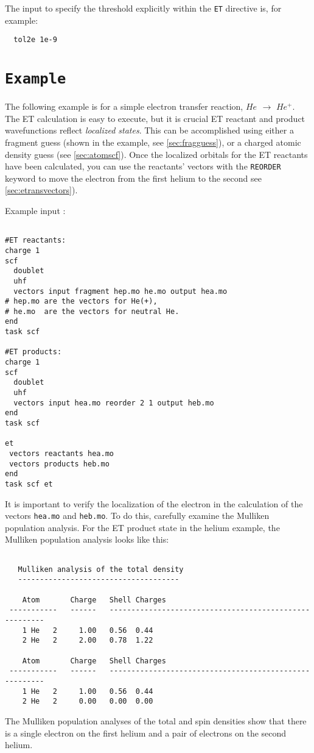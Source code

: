 The input to specify the threshold explicitly within the \verb+ET+
directive is, for example:

\begin{verbatim}
  tol2e 1e-9
\end{verbatim}

\section{{\tt Example}}

The following example is for a simple electron transfer reaction, $He_{}$ $\rightarrow$ $He^{ +}$.
The ET calculation is easy to execute, but it is crucial ET reactant and product
wavefunctions reflect {\em localized states}. This can be accomplished
using either a fragment guess (shown in the example, see \ref{sec:fragguess}), or a charged atomic
density guess (see \ref{sec:atomscf}). 
Once the localized orbitals for the ET reactants have been calculated, you can use the 
reactants' vectors with the
\verb+REORDER+ keyword to move the electron from the first helium to the second see \ref{sec:etransvectors}).

Example input :
\begin{verbatim}

#ET reactants:
charge 1
scf 
  doublet
  uhf
  vectors input fragment hep.mo he.mo output hea.mo 
# hep.mo are the vectors for He(+), 
# he.mo  are the vectors for neutral He.
end 
task scf

#ET products:
charge 1
scf 
  doublet
  uhf
  vectors input hea.mo reorder 2 1 output heb.mo 
end 
task scf

et
 vectors reactants hea.mo 
 vectors products heb.mo
end
task scf et       

\end{verbatim}
It is important to verify the localization of the electron in the calculation 
of the vectors \verb+hea.mo+ and \verb+heb.mo+. To do this, carefully examine the Mulliken population
analysis.  For the ET product state in the helium example, the Mulliken population
analysis looks like this:

\begin{verbatim}

   Mulliken analysis of the total density
   -------------------------------------

    Atom       Charge   Shell Charges
 -----------   ------   -------------------------------------------------------
    1 He   2     1.00   0.56  0.44
    2 He   2     2.00   0.78  1.22

    Atom       Charge   Shell Charges
 -----------   ------   -------------------------------------------------------
    1 He   2     1.00   0.56  0.44
    2 He   2     0.00   0.00  0.00
\end{verbatim}
The Mulliken population analyses of the total and spin densities show that there is a single electron on
the first helium and a pair of electrons on the second helium.  


